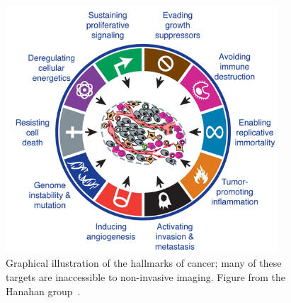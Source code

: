 	\begin{figure}[htbp] 
		\begin{center}
		\includegraphics[width=4in]{intro/./intro-images/cancerHallmarks.png}
		\caption{Graphical illustration of the hallmarks of cancer; many of these targets are inaccessible to
		non-invasive imaging. Figure from the Hanahan group~\cite{Hanahan:2011gu}.}
		\label{cancerHallmarks}
		\end{center}
	\end{figure}

